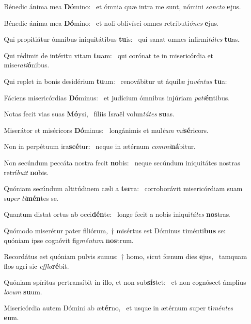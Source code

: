 \item Bénedic ánima mea \textbf{Dó}mino:~\psstar{} et ómnia quæ intra me sunt, nómini \textit{sancto} \textbf{e}jus.
\item Bénedic ánima mea \textbf{Dó}mino:~\psstar{} et noli oblivísci omnes retributi\textit{ónes} \textbf{e}jus.
\item Qui propitiátur ómnibus iniquitátibus \textbf{tu}is:~\psstar{} qui sanat omnes infirmi\textit{tátes} \textbf{tu}as.
\item Qui rédimit de intéritu vitam \textbf{tu}am:~\psstar{} qui corónat te in misericórdia et mise\textit{rati}\textbf{ó}nibus.
\item Qui replet in bonis desidérium \textbf{tu}um:~\psstar{} renovábitur ut áquilæ ju\textit{véntus} \textbf{tu}a:
\item Fáciens misericórdias \textbf{Dó}mi\-nus:~\psstar{} et judícium ómnibus injúriam \textit{pati}\textbf{én}tibus.
\item Notas fecit vias suas \textbf{Mó}ysi,~\psstar{} fíliis Israël volun\textit{tátes} \textbf{su}as.
\item Miserátor et miséricors \textbf{Dó}minus:~\psstar{} longánimis et mul\textit{tum} \textit{mi}\textbf{sé}ricors.
\item Non in perpétuum ira\textbf{scé}tur:~\psstar{} neque in ætérnum \textit{commi}\textbf{ná}bi\-tur.
\item Non secúndum peccáta nostra fecit \textbf{no}bis:~\psstar{} neque secúndum iniquitátes nostras retrí\textit{buit} \textbf{no}bis.
\item Quóniam secúndum altitúdinem cæli a \textbf{ter}ra:~\psstar{} corroborávit misericórdiam suam su\textit{per} \textit{ti}\textbf{mén}tes se.
\item Quantum distat ortus ab occi\textbf{dén}te:~\psstar{} longe fecit a nobis iniqui\textit{tátes} \textbf{nos}tras.
\item Quómodo miserétur pater filiórum,~† misértus est Dóminus timénti\textbf{bus} se:~\psstar{} quóniam ipse cognóvit fig\textit{méntum} \textbf{nos}trum.
\item Recordátus est quóniam pulvis sumus:~† homo, sicut fœnum dies \textbf{e}jus,~\psstar{} tamquam flos agri sic \textit{efflo}\textbf{ré}bit.
\item Quóniam spíritus pertransíbit in illo, et non sub\textbf{sís}tet:~\psstar{} et non cognóscet ámplius \textit{locum} \textbf{su}um.
\item Misericórdia autem Dómini ab æ\textbf{tér}no,~\psstar{} et usque in ætérnum super ti\textit{méntes} \textbf{e}um.
